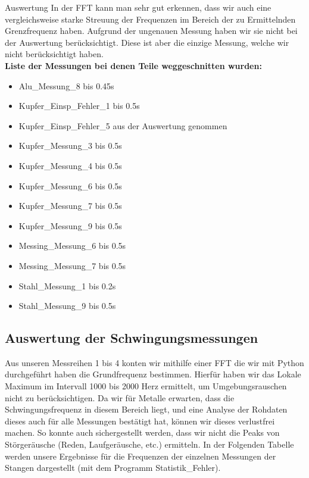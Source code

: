 \documentclass[twoside]{protokoll}
\begin{document}
\begin{aufgabe}{Auswertung}
In der FFT kann man sehr gut erkennen, dass wir auch eine vergleichsweise starke Streuung der Frequenzen im Bereich der zu Ermittelnden Grenzfrequenz haben.
Aufgrund der ungenauen Messung haben wir sie nicht bei der Auswertung berücksichtigt.
Diese ist aber die einzige Messung, welche wir nicht berücksichtigt haben. \\
 

\textbf{Liste der Messungen bei denen Teile weggeschnitten wurden:}
\begin{itemize}
\item Alu\_Messung\_8 bis 0.45s
\item Kupfer\_Einsp\_Fehler\_1 bis 0.5s
\item Kupfer\_Einsp\_Fehler\_5 aus der Auswertung genommen
\item Kupfer\_Messung\_3 bis 0.5s
\item Kupfer\_Messung\_4 bis 0.5s
\item Kupfer\_Messung\_6 bis 0.5s
\item Kupfer\_Messung\_7 bis 0.5s
\item Kupfer\_Messung\_9 bis 0.5s
\item Messing\_Messung\_6 bis 0.5s
\item Messing\_Messung\_7 bis 0.5s
\item Stahl\_Messung\_1 bis 0.2s
\item Stahl\_Messung\_9 bis 0.5s
\end{itemize}

 
\subsection{Auswertung der Schwingungsmessungen}
Aus unseren Messreihen 1 bis 4 konten wir mithilfe einer FFT die wir mit Python durchgeführt haben die Grundfrequenz bestimmen.
Hierfür haben wir das Lokale Maximum im Intervall 1000 bis 2000 Herz ermittelt, um Umgebungsrauschen nicht zu berücksichtigen.
Da wir für Metalle erwarten, dass die Schwingungsfrequenz in diesem Bereich liegt, und eine Analyse der Rohdaten dieses auch für alle Messungen bestätigt hat, können wir dieses verlustfrei machen.
So konnte auch sichergestellt werden, dass wir nicht die Peaks von Störgeräusche (Reden, Laufgeräusche, etc.) ermitteln.
In der Folgenden Tabelle werden unsere Ergebnisse für die Frequenzen der einzelnen Messungen der Stangen dargestellt (mit dem Programm Statistik\_Fehler).



\end{aufgabe}
\end{document}

